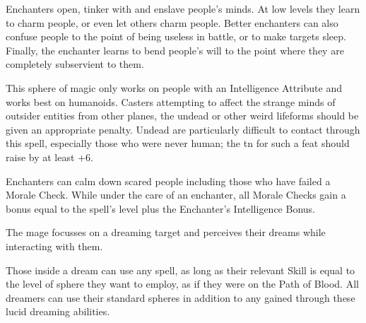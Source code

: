 \begin{multicols}{2}

\noindent
Enchanters open, tinker with and enslave people's minds. At low levels they learn to charm people, or even let others charm people. Better enchanters can also confuse people to the point of being useless in battle, or to make targets sleep. Finally, the enchanter learns to bend people's will to the point where they are completely subservient to them.

This sphere of magic only works on people with an Intelligence Attribute and works best on humanoids. Casters attempting to affect the strange minds of outsider entities from other planes, the undead or other weird lifeforms should be given an appropriate penalty. Undead are particularly difficult to contact through this spell, especially those who were never human; the \gls{tn} for such a feat should raise by at least +6.

\spelllevel


Enchanters can calm down scared people including those who have failed a Morale Check.
While under the care of an enchanter, all Morale Checks gain a bonus equal to the spell's level plus the Enchanter's Intelligence Bonus.


The mage focusses on a dreaming target and perceives their dreams while interacting with them.

Those inside a dream can use any spell, as long as their relevant Skill is equal to the level of sphere they want to employ, as if they were on the Path of Blood.
\iftoggle{verbose}{%
  For example, someone with Wyldcrafting 1 can use Plantform from the Aldaron sphere (which is a level 1 spell, and uses the Wyldcrafting Skill).
  Someone with Empathy 2 could use the Enchantment spells \textit{Calm}, and \textit{Focus}, but not \textit{Sleep} (as this is a level 3 spell.)

  Spells which have variable Skills, such as \textit{illusion}, are generally available.
  Someone with Wyldcrafting would be able to cast illusions of animals, and someone with Crafts would be able to make an illusion of a chest.

  Everyone's total \glspl{mp} determine their Metamagic ability, as usual.
}{}
All dreamers can use their standard spheres in addition to any gained through these lucid dreaming abilities.


\end{multicols}
